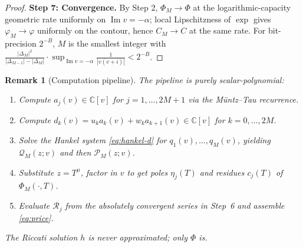 \documentclass{article}
\newtheorem{remark}[theorem]{Remark}
\newcommand{\C}{\mathbb{C}}
\newcommand{\Imag}{\operatorname{Im}}
\begin{document}
\begin{proof}
\textbf{Step 7: Convergence.}
By Step 2, $\Phi_M\to\Phi$ at the logarithmic-capacity geometric rate
uniformly on $\Imag v=-\alpha$; local Lipschitzness of $\exp$ gives
$\varphi_M\to\varphi$ uniformly on the contour, hence $C_M\to C$ at
the same rate. For bit-precision $2^{-B}$, $M$ is the smallest
integer with
$\frac{|\Delta_M|^2}{|\Delta_{M-1}|-|\Delta_M|}\cdot
\sup_{\Imag v=-\alpha}\frac{1}{|v(v+i)|}<2^{-B}$.
\end{proof}

\begin{remark}[Computation pipeline]
The pipeline is purely scalar-polynomial:
\begin{enumerate}\itemsep0pt
\item Compute $a_j(v)\in\C[v]$ for $j=1,\dots,2M+1$ via the
M\"{u}ntz--Tau recurrence.
\item Compute $d_k(v)=u_ka_k(v)+w_ka_{k+1}(v)\in\C[v]$ for
$k=0,\dots,2M$.
\item Solve the Hankel system \eqref{eq:hankel-d} for
$q_1(v),\dots,q_M(v)$, yielding $\mathcal{Q}_M(z;v)$ and then
$\mathcal{P}_M(z;v)$.
\item Substitute $z=T^\mu$, factor in $v$ to get poles $\eta_j(T)$ and
residues $c_j(T)$ of $\Phi_M(\cdot,T)$.
\item Evaluate $\mathcal{R}_j$ from the absolutely convergent series
in Step~6 and assemble \eqref{eq:price}.
\end{enumerate}
The Riccati solution $h$ is never approximated; only $\Phi$ is.
\end{remark}
\end{document}
